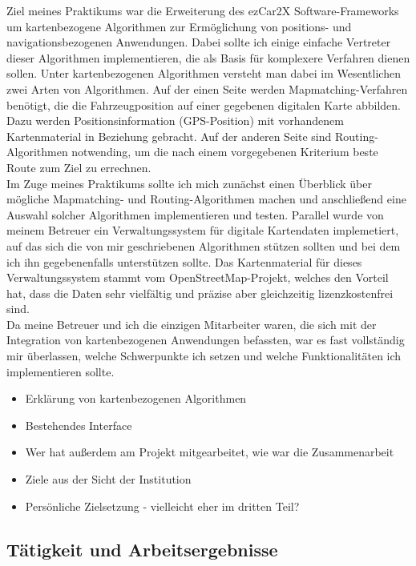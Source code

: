 \documentclass[a4paper]{scrartcl}
\begin{document}
Ziel meines Praktikums war die Erweiterung des ezCar2X Software-Frameworks um kartenbezogene Algorithmen zur Ermöglichung von positions- und navigationsbezogenen Anwendungen. Dabei sollte ich einige einfache Vertreter dieser Algorithmen implementieren, die als Basis für komplexere Verfahren dienen sollen.  Unter kartenbezogenen Algorithmen versteht man dabei im Wesentlichen zwei Arten von Algorithmen. Auf der einen Seite werden Mapmatching-Verfahren benötigt, die die Fahrzeugposition auf einer gegebenen digitalen Karte abbilden. Dazu werden Positionsinformation (GPS-Position) mit vorhandenem Kartenmaterial in Beziehung gebracht. Auf der anderen Seite sind Routing-Algorithmen notwending, um die nach einem vorgegebenen Kriterium beste Route zum Ziel zu errechnen. \\
Im Zuge meines Praktikums sollte ich mich zunächst einen Überblick über mögliche Mapmatching- und Routing-Algorithmen machen und anschließend eine Auswahl solcher Algorithmen implementieren und testen. Parallel wurde von meinem Betreuer ein Verwaltungssystem für digitale Kartendaten implemetiert, auf das sich die von mir geschriebenen Algorithmen stützen sollten und bei dem ich ihn gegebenenfalls unterstützen sollte. Das Kartenmaterial für dieses Verwaltungssystem stammt vom OpenStreetMap-Projekt, welches den Vorteil hat, dass die Daten sehr vielfältig und präzise aber gleichzeitig lizenzkostenfrei sind.  \\
Da meine Betreuer und ich die einzigen Mitarbeiter waren, die sich mit der Integration von kartenbezogenen Anwendungen befassten, war es fast vollständig mir überlassen, welche Schwerpunkte ich setzen und welche Funktionalitäten ich implementieren sollte. 

\begin{itemize}
\item Erklärung von kartenbezogenen Algorithmen
\item Bestehendes Interface
\item Wer hat außerdem am Projekt mitgearbeitet, wie war die Zusammenarbeit
\item Ziele aus der Sicht der Institution
\item Persönliche Zielsetzung - vielleicht eher im dritten Teil? 
\end{itemize}


\subsection{Tätigkeit und Arbeitsergebnisse}
\label{sec:tatigk-und-arbe}
\end{document}
